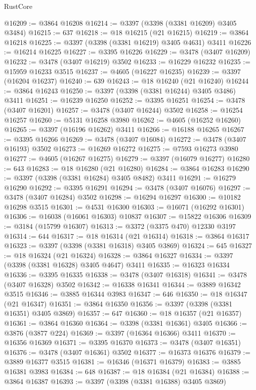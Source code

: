\begin{lexlean}{RustCore}
\begin{coremodule}
@16209 := @3864 @16208
@16214 := @3397 (@3398 (@3381 @16209) @3405 @3484)
@16215 := 637
@16218 := @18 @16215 (@21 @16215)
@16219 := @3864 @16218
@16225 := @3397 (@3398 (@3381 @16219) @3405 @4631) @3411
@16226 := @16214 @16225
@16227 := @3395 @16226
@16229 := @3478 (@3407 @16209)
@16232 := @3478 (@3407 @16219) @3502
@16233 := @16229 @16232
@16235 := @15959 @16233 @3515
@16237 := @4605 (@16227 @16235)
@16239 := @3397 (@16204 @16237)
@16240 := 639
@16243 := @18 @16240 (@21 @16240)
@16244 := @3864 @16243
@16250 := @3397 (@3398 (@3381 @16244) @3405 @3486) @3411
@16251 := @16239 @16250
@16252 := @3395 @16251
@16254 := @3478 (@3407 @16201)
@16257 := @3478 (@3407 @16244) @3502
@16258 := @16254 @16257
@16260 := @5131 @16258 @3980
@16262 := @4605 (@16252 @16260)
@16265 := @3397 (@16196 @16262) @3411
@16266 := @16188 @16265
@16267 := @3395 @16266
@16269 := @3478 (@3407 @16084)
@16272 := @3478 (@3407 @16193) @3502
@16273 := @16269 @16272
@16275 := @7593 @16273 @3980
@16277 := @4605 (@16267 @16275)
@16279 := @3397 (@16079 @16277)
@16280 := 643
@16283 := @18 @16280 (@21 @16280)
@16284 := @3864 @16283
@16290 := @3397 (@3398 (@3381 @16284) @3405 @8482) @3411
@16291 := @16279 @16290
@16292 := @3395 @16291
@16294 := @3478 (@3407 @16076)
@16297 := @3478 (@3407 @16284) @3502
@16298 := @16294 @16297
@16300 := @10182 @16298 @3515
@16301 := @4531 @16300
@16303 := @16071 (@16292 @16301)
@16306 := @16038 (@16061 @16303) @10837
@16307 := @15822 @16306
@16309 := @3184 (@15799 @16307)
@16313 := @3372 (@3375 @470) @12330 @3197
@16314 := 644
@16317 := @18 @16314 (@21 @16314)
@16318 := @3864 @16317
@16323 := @3397 (@3398 (@3381 @16318) @3405 @3869)
@16324 := 645
@16327 := @18 @16324 (@21 @16324)
@16328 := @3864 @16327
@16334 := @3397 (@3398 (@3381 @16328) @3405 @4647) @3411
@16335 := @16323 @16334
@16336 := @3395 @16335
@16338 := @3478 (@3407 @16318)
@16341 := @3478 (@3407 @16328) @3502
@16342 := @16338 @16341
@16344 := @3889 @16342 @3515
@16346 := @3885 @16344 @3983
@16347 := 646
@16350 := @18 @16347 (@21 @16347)
@16351 := @3864 @16350
@16356 := @3397 (@3398 (@3381 @16351) @3405 @3869)
@16357 := 647
@16360 := @18 @16357 (@21 @16357)
@16361 := @3864 @16360
@16364 := @3398 (@3381 @16361) @3405
@16366 := @3876 (@3877 @224)
@16369 := @3397 (@16364 @16366) @3411
@16370 := @16356 @16369
@16371 := @3395 @16370
@16373 := @3478 (@3407 @16351)
@16376 := @3478 (@3407 @16361) @3502
@16377 := @16373 @16376
@16379 := @3889 @16377 @3515
@16381 := @16346 (@16371 @16379)
@16383 := @3885 @16381 @3983
@16384 := 648
@16387 := @18 @16384 (@21 @16384)
@16388 := @3864 @16387
@16393 := @3397 (@3398 (@3381 @16388) @3405 @3869)

\end{coremodule}
\end{lexlean}
